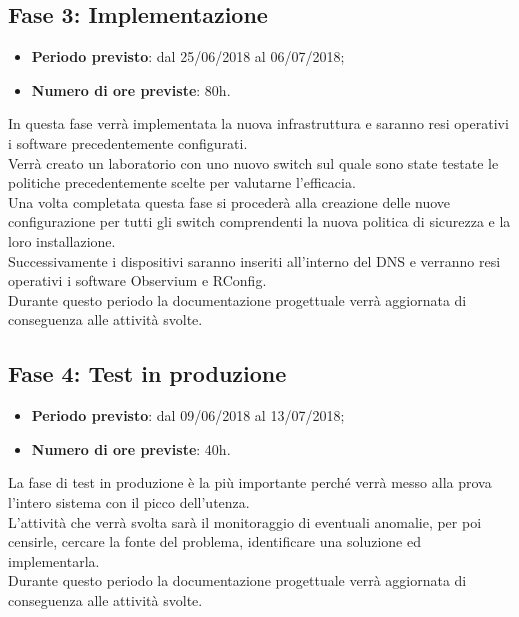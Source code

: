 \documentclass[Tesi.tex]{subfiles}
\begin{document}
\subsection{Fase 3: Implementazione}
\begin{itemize}
	\item \textbf{Periodo previsto}: dal 25/06/2018 al 06/07/2018;
	\item \textbf{Numero di ore previste}: 80h.
\end{itemize}
	
In questa fase verrà implementata la nuova infrastruttura e saranno resi operativi i software precedentemente configurati. \\
Verrà creato un laboratorio con uno nuovo switch sul quale sono state testate le politiche precedentemente scelte per valutarne l'efficacia.\\
Una volta completata questa fase si procederà alla creazione delle nuove configurazione per tutti gli switch comprendenti la nuova politica di sicurezza e la loro installazione. \\
Successivamente i dispositivi saranno inseriti all'interno del DNS e verranno resi operativi i software Observium e RConfig. \\
Durante questo periodo la documentazione progettuale verrà aggiornata di conseguenza alle attività svolte.\\


\subsection{Fase 4: Test in produzione}
\begin{itemize}
	\item \textbf{Periodo previsto}: dal 09/06/2018 al 13/07/2018;
	\item \textbf{Numero di ore previste}: 40h.
\end{itemize}
	
La fase di test in produzione è la più importante perché verrà messo alla prova l'intero sistema con il picco dell'utenza. \\
L'attività che verrà svolta sarà il monitoraggio di eventuali anomalie, per poi censirle, cercare la fonte del problema, identificare una soluzione ed implementarla. \\
Durante questo periodo la documentazione progettuale verrà aggiornata di conseguenza alle attività svolte.\\

	
\end{document}
